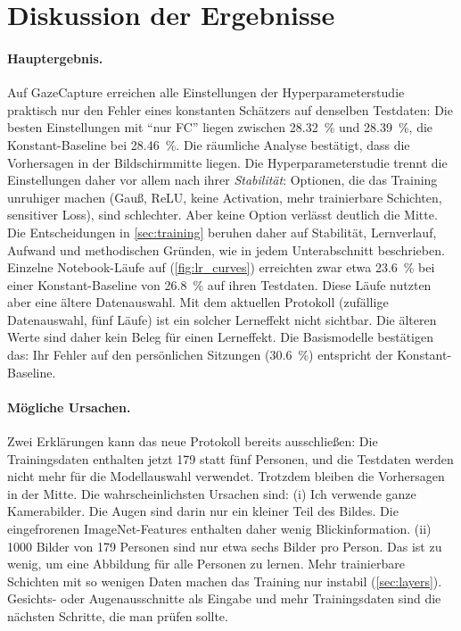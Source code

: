 \section{Diskussion der Ergebnisse}
\label{sec:discussion}

\paragraph{Hauptergebnis.}
Auf GazeCapture erreichen alle Einstellungen der Hyperparameterstudie
praktisch nur den Fehler eines konstanten Schätzers auf denselben Testdaten:
Die besten Einstellungen mit \enquote{nur FC} liegen zwischen
\SI{28,32}{\percent} und \SI{28,39}{\percent}, die Konstant-Baseline bei
\SI{28,46}{\percent}. Die räumliche Analyse bestätigt, dass die Vorhersagen
in der Bildschirmmitte liegen. Die Hyperparameterstudie trennt die
Einstellungen daher vor allem nach ihrer \emph{Stabilität}: Optionen, die das
Training unruhiger machen (Gauß, ReLU, keine Activation, mehr trainierbare
Schichten, sensitiver Loss), sind schlechter. Aber keine Option verlässt
deutlich die Mitte. Die Entscheidungen in \cref{sec:training} beruhen daher
auf Stabilität, Lernverlauf, Aufwand und methodischen Gründen, wie in jedem
Unterabschnitt beschrieben. Einzelne Notebook-Läufe auf 
(\cref{fig:lr_curves}) erreichten zwar etwa
\SI{23,6}{\percent} bei einer Konstant-Baseline von \SI{26,8}{\percent} auf
ihren Testdaten. Diese Läufe nutzten aber eine ältere Datenauswahl. Mit dem
aktuellen Protokoll (zufällige Datenauswahl, fünf Läufe) ist ein solcher
Lerneffekt nicht sichtbar. Die älteren Werte sind daher kein Beleg für einen
Lerneffekt. Die Basismodelle bestätigen das: Ihr Fehler auf den persönlichen
Sitzungen (\SI{30,6}{\percent}) entspricht der Konstant-Baseline.

\paragraph{Mögliche Ursachen.} Zwei Erklärungen kann das neue Protokoll
bereits ausschließen: Die Trainingsdaten enthalten jetzt 179 statt fünf
Personen, und die Testdaten werden nicht mehr für die Modellauswahl verwendet.
Trotzdem bleiben die Vorhersagen in der Mitte. Die wahrscheinlichsten Ursachen
sind:
(i) Ich verwende ganze Kamerabilder. Die Augen sind darin nur ein kleiner Teil
des Bildes. Die eingefrorenen ImageNet-Features enthalten daher wenig
Blickinformation.
(ii) \num{1000} Bilder von 179 Personen sind nur etwa sechs Bilder pro Person.
Das ist zu wenig, um eine Abbildung für alle Personen zu lernen. Mehr
trainierbare Schichten mit so wenigen Daten machen das Training nur instabil
(\cref{sec:layers}).
Gesichts- oder Augenausschnitte als Eingabe und mehr Trainingsdaten sind die
nächsten Schritte, die man prüfen sollte.

